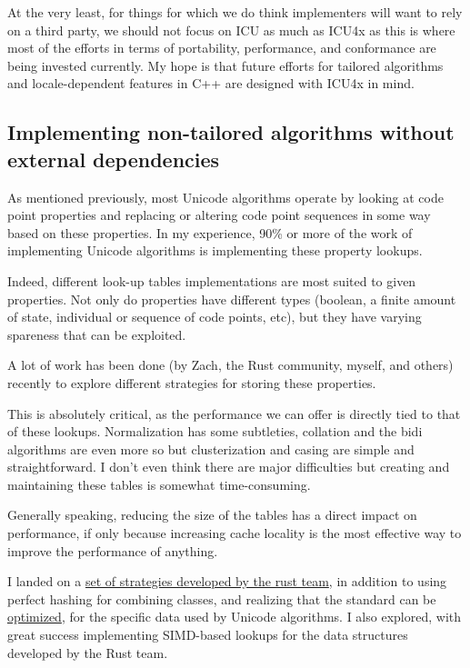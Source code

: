 \documentclass{wg21}
\begin{document}
At the very least, for things for which we do think implementers will want to rely on a third party, we should not focus on ICU as much as ICU4x as this is where most of the efforts in terms of portability, performance, and conformance are being invested currently.
My hope is that future efforts for tailored algorithms and locale-dependent features in C++ are designed with ICU4x in mind.

\subsection{Implementing non-tailored algorithms without external dependencies}

As mentioned previously, most Unicode algorithms operate by looking at code point properties and replacing or altering code point sequences in some way based on these properties.
In my experience, 90\% or more of the work of implementing Unicode algorithms is implementing these property lookups.

Indeed, different look-up tables implementations are most suited to given properties. Not only do properties have different types (boolean, a finite amount of state, individual or sequence of code points, etc), but they have varying spareness that can be exploited.

A lot of work has been done (by Zach, the Rust community, myself, and others) recently to explore different strategies for storing these properties.

This is absolutely critical, as the performance we can offer is directly tied to that of these lookups.
Normalization has some subtleties, collation and the bidi algorithms are even more so but clusterization and casing are simple and straightforward.
I don't even think there are major difficulties but creating and maintaining these tables is somewhat time-consuming.

Generally speaking, reducing the size of the tables has a direct impact on performance, if only because increasing cache locality
is the most effective way to improve the performance of anything.

I landed on a \href{https://github.com/rust-lang/rust/blob/master/src/tools/Unicode-table-generator/src/main.rs}{set of strategies developed by the rust team},
in addition to using perfect hashing for combining classes, and realizing that the standard  can be \href{https://arxiv.org/pdf/1509.05053.pdf}{optimized}, for the specific data used by Unicode algorithms.
I also explored, with great success implementing SIMD-based lookups for the data structures developed by the Rust team.
\end{document}
